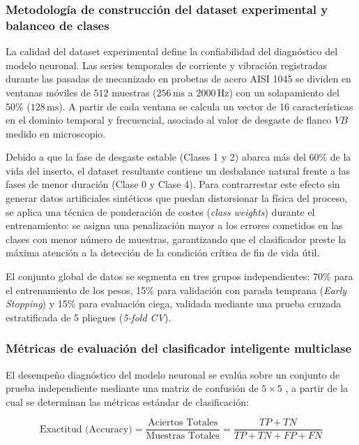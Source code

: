 \subsubsection{Metodología de construcción del dataset experimental y balanceo de clases}

La calidad del dataset experimental define la confiabilidad del diagnóstico del modelo neuronal. Las series temporales de corriente y vibración registradas durante las pasadas de mecanizado en probetas de acero AISI 1045 se dividen en ventanas móviles de $512$ muestras ($256\,\text{ms}$ a $2000\,\text{Hz}$) con un solapamiento del 50\% ($128\,\text{ms}$). A partir de cada ventana se calcula un vector de 16 características en el dominio temporal y frecuencial, asociado al valor de desgaste de flanco $VB$ medido en microscopio.

Debido a que la fase de desgaste estable (Clases 1 y 2) abarca más del 60\% de la vida del inserto, el dataset resultante contiene un desbalance natural frente a las fases de menor duración (Clase 0 y Clase 4). Para contrarrestar este efecto sin generar datos artificiales sintéticos que puedan distorsionar la física del proceso, se aplica una técnica de ponderación de costes (\textit{class weights}) durante el entrenamiento: se asigna una penalización mayor a los errores cometidos en las clases con menor número de muestras, garantizando que el clasificador preste la máxima atención a la detección de la condición crítica de fin de vida útil.

El conjunto global de datos se segmenta en tres grupos independientes: 70\% para el entrenamiento de los pesos, 15\% para validación con parada temprana (\textit{Early Stopping}) y 15\% para evaluación ciega, validada mediante una prueba cruzada estratificada de 5 pliegues (\textit{5-fold CV}).


\subsubsection{Métricas de evaluación del clasificador inteligente multiclase}

El desempeño diagnóstico del modelo neuronal se evalúa sobre un conjunto de prueba independiente mediante una matriz de confusión de $5 \times 5$ \citep{huang2026}, a partir de la cual se determinan las métricas estándar de clasificación:

\begin{equation}
\text{Exactitud (Accuracy)} = \frac{\text{Aciertos Totales}}{\text{Muestras Totales}} = \frac{TP + TN}{TP + TN + FP + FN}
\label{eq:exactitud}
\end{equation}

